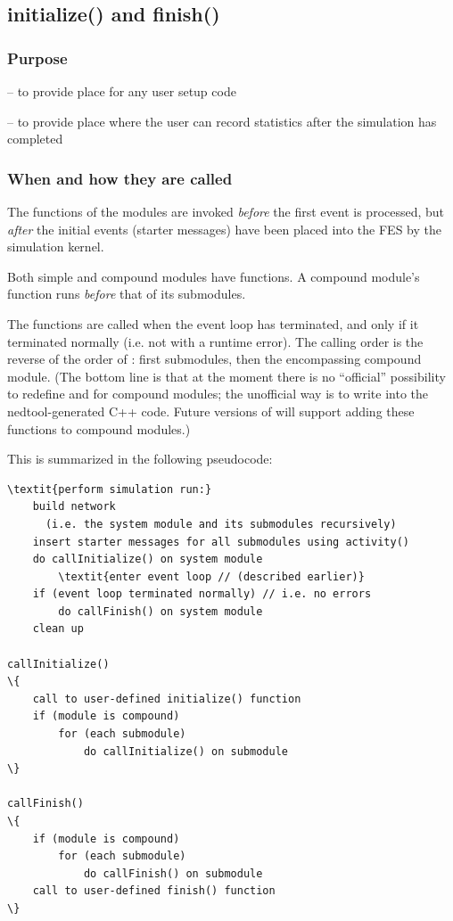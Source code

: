 \subsection{initialize() and finish()}

\subsubsection{Purpose}


 -- to provide place for any user setup code

 -- to provide place where the user can record statistics
after the simulation has completed


\subsubsection{When and how they are called}


The  functions of the modules are invoked
\textit{before} the first event is processed, but \textit{after} the
initial events (starter messages) have been
placed into the FES by the simulation kernel.


Both simple and compound modules have  functions.
A compound module's  function runs
\textit{before} that of its submodules.


The  functions are called when the event
loop has terminated, and only if it terminated
normally (i.e. not with a runtime error).  The calling order is the
reverse of the order of : first submodules, then the
encompassing compound module. (The bottom line is that at the moment
there is no ``official'' possibility to redefine 
and  for compound modules; the unofficial way is to
write into the nedtool-generated C++ code. Future versions of {\opp} will
support adding these functions to compound modules.)

This is summarized in the following pseudocode:


\begin{Verbatim}[commandchars=\\\{\}]
\textit{perform simulation run:}
    build network
      (i.e. the system module and its submodules recursively)
    insert starter messages for all submodules using activity()
    do callInitialize() on system module
        \textit{enter event loop // (described earlier)}
    if (event loop terminated normally) // i.e. no errors
        do callFinish() on system module
    clean up

callInitialize()
\{
    call to user-defined initialize() function
    if (module is compound)
        for (each submodule)
            do callInitialize() on submodule
\}

callFinish()
\{
    if (module is compound)
        for (each submodule)
            do callFinish() on submodule
    call to user-defined finish() function
\}
\end{Verbatim}



